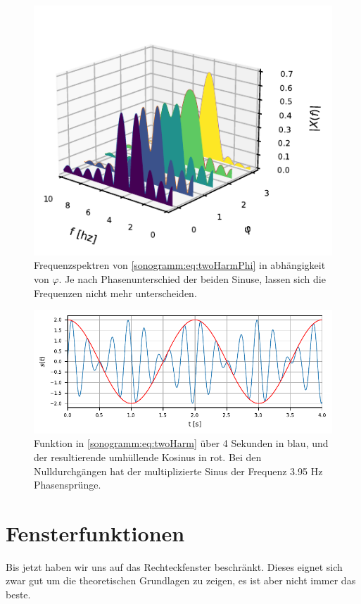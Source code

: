 \begin{figure}
    \centering
    \includegraphics{papers/sonogramm/images/twoharmphasedifff.pdf}
    \caption{Frequenzspektren von \eqref{sonogramm:eq:twoHarmPhi} in abhängigkeit von $\varphi$.
    Je nach Phasenunterschied der beiden Sinuse, lassen sich die Frequenzen nicht mehr unterscheiden.
    \label{sonogramm:freqdiffdemo}
    }
\end{figure}

\begin{figure}
    \centering
    \includegraphics{papers/sonogramm/images/twoharmTime.pdf}
    \caption{Funktion in \eqref{sonogramm:eq:twoHarm} über 4 Sekunden in blau, und der resultierende
    umhüllende Kosinus in rot.
    Bei den Nulldurchgängen hat der multiplizierte Sinus der Frequenz 3.95 Hz Phasensprünge.
    \label{sonogramm:twoHarmTime}
    }
\end{figure}

\section{Fensterfunktionen}
\label{sonogramm:section:windows}
Bis jetzt haben wir uns auf das Rechteckfenster beschränkt.
Dieses eignet sich zwar gut um die theoretischen Grundlagen zu zeigen,
es ist aber nicht immer das beste.

